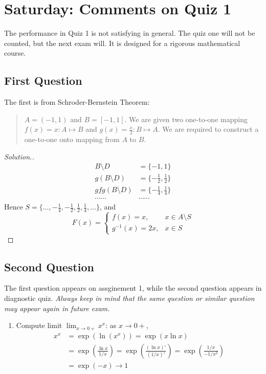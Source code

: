 
\section{Saturday: Comments on Quiz 1}
The performance in Quiz 1 is not satisfying in general. The quiz one will not be counted, but the next exam will. It is designed for a rigorous mathematical course. 

\subsection{First Question}
The first is from Schroder-Bernstein Theorem: 
\begin{quotation}
$A=(-1,1)$ and $B=[-1,1]$. We are given two one-to-one mapping $f(x)=x:A\mapsto B$ and $g(x)=\frac{x}{2}:B\mapsto A$. We are required to construct a one-to-one onto mapping from $A$ to $B$.
\end{quotation}
\begin{proof}[Solution.]
\begin{align*}
B\setminus D&=\{-1,1\}\\
g(B\setminus D)&=\{-\frac{1}{2},\frac{1}{2}\}\\
gfg(B\setminus D)&=\{-\frac{1}{4},\frac{1}{4}\}\\
\cdots\cdots&\cdots\cdots
\end{align*}
Hence $S=\{\dots,-\frac{1}{4},-\frac{1}{2},\frac{1}{2},\frac{1}{4},\dots\}$, and
\[
F(x)=\left\{
\begin{aligned}
f(x)=x,& x\in A\setminus S\\
g^{-1}(x)=2x,& x\in S
\end{aligned}
\right.
\]
\end{proof}


\subsection{Second Question}
The first question appears on assginement 1, while the second question appears in diagnostic quiz. \emph{Always keep in mind that the same question or similar question may appear again in future exam.}
\begin{enumerate}
\item
Compute limit $\lim_{x\to0+}x^x$: as $x\to 0+$,
\begin{align*}
x^x&=\exp(\ln(x^x))=\exp(x\ln x)\\
&=\exp(\frac{\ln x}{1/x})=\exp(\frac{(\ln x)'}{(1/x)'})=\exp(\frac{1/x}{-1/x^2})\\
&=\exp(-x)\to 1
\end{align*}



\end{enumerate}

